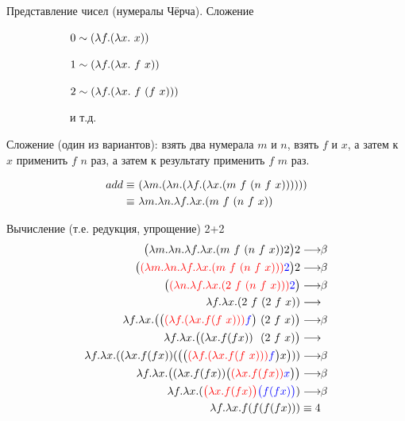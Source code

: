 \begin{frame}{Представление чисел (нумералы Чёрча). Сложение}
\begin{figure}[t]
    \begin{subfigure}[t]{0.45\textwidth}
$ 0 \sim (\lambda f . (\lambda x . \ x))$

$ 1 \sim \lam{f}{\lam{x}{\ f\ x}}$

$ 2 \sim \lam{f}{\lam{x}{\ f\ (f\ x)}}$

  и т.д.
    \end{subfigure}
    \begin{subfigure}[t]{0.45\textwidth}
    \begin{minipage}{\textwidth}
    \numeralIsFor
    \end{minipage}
    \end{subfigure}
\end{figure}

  \vspace{1cm}

  Сложение (один из вариантов): взять два нумерала $m$ и $n$, взять $f$ и $x$, а затем к $x$ применить $f$ $n$ раз, а затем к результату применить $f$ $m$ раз.

\begin{align*}
add \equiv &\ \lam{m}{\lam{n}{\lam{f}{\lam{x}{\app{m\ f\ }{\app{n\ f\ }{x}}}}}}\\
\equiv &\ \lambda m. \lambda n. \lambda f. \lambda x. \app{m\ f\ }{\app{n\ f\ }{x}}
\end{align*}
\end{frame}


\begin{frame}{Вычисление (т.е. редукция, упрощение) 2+2}
\def\betaarr{\longrightarrow\!\!\beta}
\def\numTWO{\ensuremath{\lam{f}{\lam{x}{f(f\ x)}}}}
\vspace{-2em}
  \begin{align}
    \App{\lambda m. \lambda n. \lambda f. \lambda x. \app{m\ f\ }{\app{n\ f\ }{x}} }{2} 2 & \betaarr \\
    \Redex{(\lambda m. \lambda n. \lambda f. \lambda x. \app{m\ f\ }{\app{n\ f\ }{x}}) {}}{2} 2 & \betaarr \\
    \Redex{( \lambda n. \lambda f. \lambda x. \app{2\ f\ }{\app{n\ f\ }{x}}){}}{2} & \betaarr \\
    \lambda f. \lambda x. \app{2\ f\ }{\app{2\ f\ }{x}}   & \longrightarrow \\
    \lambda f. \lambda x. \App{\Redex{\numTWO}{f}\ }{\app{2\ f\ }{x}} & \betaarr \\
    \lambda f. \lambda x. \App{\lam{x}{f (f x)} \ \ }{\app{2\ f\ }{x}} & \longrightarrow \\
    \lambda f. \lambda x. \app{\lam{x}{f (f x)}} {\app{\App{\Redex{\numTWO}{f}}{x}}} & \betaarr \\
    \lambda f. \lambda x. \App{\lam{x}{f (f x)}  } {\Redex{\lam{x}{f (f x)} }{x}} & \betaarr \\
    \lambda f. \lambda x. \redex{\Lam{x}{f (f x)}}{\App{f}{\app{f}{x}}} & \betaarr \\
    \lambda f. \lambda x. f (f (f (f x))) & \equiv 4
  \end{align}
\end{frame}

